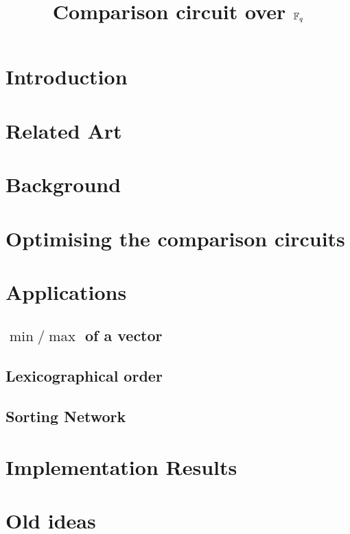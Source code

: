\documentclass{llncs}
\title{Comparison circuit over $\mathbb{F}_q$}
\date{}
\author{}
\begin{document}
\maketitle

\section{Introduction}
\label{sec:introduction}




\section{Related Art}
\label{sec:related-art}



\section{Background}
\label{sec:background}


% 

\section{Optimising the comparison circuits}
\label{sec:comparison-circuit}



\section{Applications}
\label{sec:applications}

\subsection{$\min/\max$ of a vector}
\label{sec:min/max}

\subsection{Lexicographical order}
\label{sec:lexic-order}

\subsection{Sorting Network}
\label{sec:sorting-network}


\section{Implementation Results}
\label{sec:impl-results}


\section{Old ideas}




\end{document}
